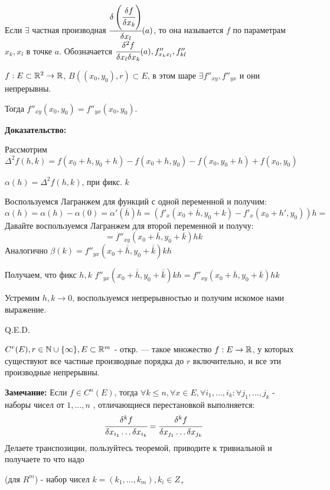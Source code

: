 Если $\exists$ частная производная $\cfrac{\delta\left( \cfrac{\delta f}{\delta x _k}\right)}{\delta x_l}(a)$, то она называется   $f$ по параметрам $x_k, x_l$ в точке $a$. Обозначается $\cfrac{\delta^2 f}{\delta x_l\delta x_k}(a), f_{x_kx_l}'', f_{kl}''$


$f: E \subset \mathbb{R}^2 \rightarrow \mathbb{R}$, $B((x_0,y_0),r) \subset E$, в этом шаре $\exists f''_{xy}, f''_{yx}$ и они непрерывны.

Тогда $f''_{xy}(x_0,y_0)=f''_{yx}(x_0,y_0)$.

\textbf{Доказательство:}

Рассмотрим $\Delta^2f(h,k) = f(x_0+h,y_0+h)-f(x_0+h,y_0) - f(x_0,y_0+h)+f(x_0,y_0) $

$\alpha(h) = \Delta^2 f(h,k)$, при фикс. $k$

Воспользуемся Лагранжем для функций с одной переменной и получим:
$$\alpha(h) = \alpha(h) - \alpha(0) = \alpha'(\overline{h})h = (f'_{x}(x_0 + \overline{h}, y_0 + k)-f'_x(x_0 + h', y_0))h=$$
Давайте воспользуемся Лагранжем для второй переменной и получу:
$$=f''_{xy}(x_0 + \overline{h}, y_0 + \overline{k})hk$$
Аналогично $\beta(k) = f''_{yx}(x_0 + \overline{\overline{h}}, y_0 + \overline{\overline{k}})kh$

Получаем, что фикс $h,k$ $f''_{yx}(x_0 + \overline{\overline{h}}, y_0 + \overline{\overline{k}})kh =f''_{xy}(x_0 + \overline{h}, y_0 + \overline{k})hk $

Устремим $h,k \rightarrow 0$, воспользуемся непрерывностью и получим искомое нами выражение.

\hfill Q.E.D.

  $C^r(E), r \in \mathbb{N} \cup \{\infty\}, E \subset \mathbb{R}^m$ - откр. --- такое множество $f: E\rightarrow \mathbb{R}$, у которых существуют все частные производные порядка до $r$ включительно, и все эти производные непрерывны.

\textbf{Замечание:} Если $f \in C^n(E)$, тогда $\forall k \leq n, \forall x \in E, \forall i_1,\ldots,i_k:\forall j_1,\ldots, j_k$ - наборы чисел от $1,\ldots ,n$ , отличающиеся перестановкой выполняется:
$$\cfrac{\delta^kf}{\delta x_{i_1}\ldots \delta{x_{i_k}}} =\cfrac{\delta^kf}{\delta x_{j_1}\ldots \delta{x_{j_k}}} $$
Делаете транспозиции, пользуйтесь теоремой, приводите к тривиальной и получаете  то что надо

  (для $R^m$) - набор чисел $k = (k_1,\ldots, k_m), k_i\in Z_{+}$

